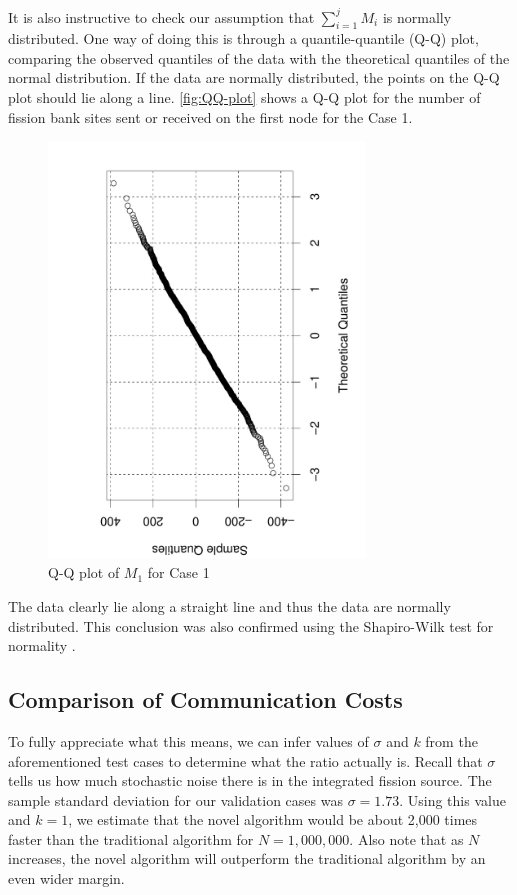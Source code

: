 It is also instructive to check our assumption that $\sum_{i=1}^j M_i$ is
normally distributed. One way of doing this is through a quantile-quantile (Q-Q)
plot, comparing the observed quantiles of the data with the theoretical
quantiles of the normal distribution. If the data are normally distributed, the
points on the Q-Q plot should lie along a line. \autoref{fig:QQ-plot} shows a
Q-Q plot for the number of fission bank sites sent or received on the first node
for the Case 1.
\begin{figure}[ht!]
  \centering
  \includegraphics[width=0.75\textwidth,angle=-90]{figures/ch3/QQ_plot/QQplot.pdf}
  \caption{Q-Q plot of $M_1$ for Case 1}
  \label{fig:QQ-plot}
\end{figure}
The data clearly lie along a straight line and thus the data are normally
distributed. This conclusion was also confirmed using the Shapiro-Wilk test for
normality \cite{biometrika-shapiro-1965}.

\subsection{Comparison of Communication Costs}

To fully appreciate what this means, we can infer values of $\sigma$ and $k$
from the aforementioned test cases to determine what the ratio actually
is. Recall that $\sigma$ tells us how much stochastic noise there is in the
integrated fission source. The sample standard deviation for our validation
cases was $\sigma = 1.73$. Using this value and $k = 1$, we estimate that the
novel algorithm would be about 2,000 times faster than the traditional algorithm
for $N = 1,000,000$. Also note that as $N$ increases, the novel algorithm will
outperform the traditional algorithm by an even wider margin.

